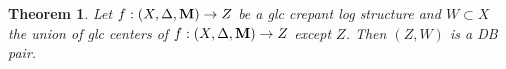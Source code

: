 \documentclass[11pt]{amsart}
\numberwithin{equation}{section}
\newcommand{\Mm}{{\bf{M}}}
\newcommand{\NN}{{\bf{N}}}
\newcommand{\Qq}{\mathbb{Q}}
\newcommand{\red}{\operatorname{red}}
\newcommand{\lf}{\lfloor}
\newcommand{\rf}{\rfloor}
\newcommand{\Oo}{\mathcal{O}}
\newtheorem{thm}{Theorem}[section]
\theoremstyle{definition}
\theoremstyle{definition}
\theoremstyle{definition}
\begin{document}
\begin{thm}\label{thm: (Z,W) is DB for glc crepant log structure}
Let $f:(X,\Delta,\Mm)\to Z$ be a glc crepant log structure and $W\subset X$ the union of glc centers of $f:(X,\Delta,\Mm)\to Z$ except $Z$. Then $(Z,W)$ is a DB pair.
\end{thm}
\begin{comment}
\begin{proof}
By Remark \ref{rem: to q coefficients}, we may assume that $(X,\Delta,\Mm)$ is a $\Qq$-g-pair. Let $(Z,\Delta_Z,\NN)/U$ be a glc $\mathbb Q$-g-pair induced by a canonical bundle formula$/U$ of $f: (X,\Delta,\Mm)\rightarrow Z$. By Lemma \ref{lem: glc centers come from cbf}, the glc centers of $(Z,\Delta_Z,\NN)$ are exactly the glc centers of $f: (X,\Delta,\Mm)\rightarrow Z$. Possibly replacing $(X,\Delta,\Mm)$ with a gdlt model of $(Z,\Delta_Z,\NN)$, we may assume that $f$ is birational and $(X,\Delta,\Mm)$ is $\mathbb Q$-factorial gdlt.
Then we have the following diagram
\begin{center}
$\xymatrix{
Y\ar@{->}[r]^{\pi}\ar@{->}[dr]^{g} & X\ar@{->}[d]^{f}\\
 & Z\\
}$
\end{center}
where $\pi$ is a log resolution such that $\Mm$ descends to $Y$ and $F:=g^{-1}(W)_{\red}$ is an snc divisor. Let
$$
K_Y+\Delta_Y+\Mm_Y:=\pi^*(K_X+\Delta+\Mm_X).
$$
and $D:=\Delta_Y^{=1}$. Since $\Mm_Y$ is nef$/Z$ and big$/Z$, there exists $0\le\Delta'_Y\sim_{\Qq,Z}\Mm_Y$ such that $(Y,\Delta_Y-D+\Delta'_Y)$ is sub-klt. Let $\bar{\Delta}_Y:=(\Delta_Y-D+\Delta'_Y)^{\ge0}$ and $E:=(\Delta_Y-D+\Delta'_Y)^{\le 0}$, then $\lf\bar{\Delta}_Y\rf=0$ and $E$ is exceptional over $Z$. Possibly replacing $Y$ with a higher resolution, we may assume that $D+E+\bar{\Delta}_Y$ is snc.


Since $E-D\ge-F$, we have natural maps:
$$
g_*\Oo_Y(-F)\to Rg_*\Oo_Y(-F)\to Rg_*\Oo_Y(E-D).
$$
Since $E-D\sim_{\Qq,Z}K_Y+\bar{\Delta}_Y$, by \cite[Theorem 10.41]{Kol13},
$$
Rg_*\Oo_Y(E-D)\simeq_{qis}\sum_{i}R^ig_*\Oo_Y(E-D)[i].
$$
Thus we get a morphism 
$$
g_*\Oo_Y(-F)\to Rg_*\Oo_Y(-F)\to Rg_*\Oo_Y(E-D)\to g_*\Oo_Y(E-D).
$$
Note that 
$$
g_*\Oo_Y(E-D)=g_*\Oo_Y(E-D)\cap g_*\Oo_Y(E)=g_*\Oo_Y(E-D)\cap g_*\Oo_Y=g_*\Oo_Y(-D).
$$
Since $D$ is reduced and $g(D)=W$, we have $g_*\Oo_Y(-D)=\mathcal{I}_W$, the ideal sheaf of $W$ in $Z$. Moreover, $g_*\Oo_Y=\mathcal{I}_W$ since $F$ is also reduced. Therefore, we get an isomorphism $\mathcal{I}_W=g_*\Oo_Y(-F)\to g_*\Oo(E-D)$, which implies that 
$$
\rho: \mathcal{I}_W\simeq g_*\mathcal{I}_F\to Rg_*\mathcal{I}_F
$$
has a left inverse. Since $Y$ is smooth and $F$ is an snc divisor, we see that $(Y,F)$ is a DB pair, thus by \cite[Theorem 3.3]{Kov12} (cf. \cite[Theorem 6.27]{Kol13}), $(Z,W)$ is also a DB pair. \end{proof}
\end{comment}
\end{document}
